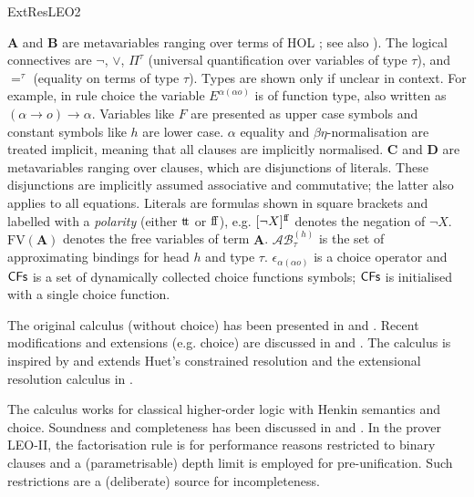 \begin{entry}{ExtResLEO2}
 \begin{clarifications} 
 $\mathbf{A}$ and $\mathbf{B}$ are metavariables ranging over terms of HOL \cite{sep-type-theory-church}; see also ). The logical connectives are $\neg$, $\vee$, $\Pi^\tau$ (universal quantification over variables of type $\tau$), and $=^\tau$ (equality on terms of type $\tau$). Types are shown only if unclear in context. For example, in  rule choice the variable $E^{\alpha (\alpha o)}$ is of function type, also written as ${(\alpha \rightarrow o) \rightarrow \alpha}$. Variables like $F$ are presented as upper case symbols and constant symbols like $h$  are lower case. $\alpha$ equality and $\beta\eta$-normalisation are treated implicit, meaning that all clauses are implicitly normalised. $\mathbf{C}$ and $\mathbf{D}$ are metavariables ranging over clauses, which are disjunctions of literals. These disjunctions are implicitly assumed associative and commutative; the latter also applies to all equations. Literals are formulas shown in square brackets and labelled with a \emph{polarity} (either ${\mathrm{t}\!\mathrm{t}}$ or ${\mathrm{f}\!\mathrm{f}}$), e.g. $[\neg X]^{\mathrm{f}\!\mathrm{f}}$ denotes the negation of $\neg X$.  $\mathrm{FV}(\mathbf{A})$ denotes the free variables of term $\mathbf{A}$. $\mathcal{AB}^{(h)}_\tau$ is the set of approximating bindings for head $h$ and type $\tau$. $\epsilon_{\alpha (\alpha o)}$ is a choice operator and $\textsf{CFs}$ is a set of dynamically collected choice functions symbols; $\textsf{CFs}$ is initialised with a single choice function.
\end{clarifications}


 \begin{history}
The original calculus (without choice) has been presented in \cite{C5} and \cite{J5}. Recent modifications and extensions (e.g. choice) are discussed in  \cite{W47} and \cite{EasyChair:215}.
The calculus is inspired by and extends Huet's constrained resolution \cite{Huet:amott73,Huet:cracmfhol72} and the extensional resolution calculus in \cite{C2}.
 \end{history}

\begin{technicalities} 
The calculus works for classical higher-order logic with Henkin semantics and choice. Soundness and completeness has been discussed in  \cite{C5} and \cite{J5}. In the prover LEO-II, the factorisation rule is for performance reasons restricted to binary clauses and a (parametrisable) depth limit is employed for pre-unification. Such restrictions are a (deliberate) source for incompleteness.
 \end{technicalities}



\end{entry}
